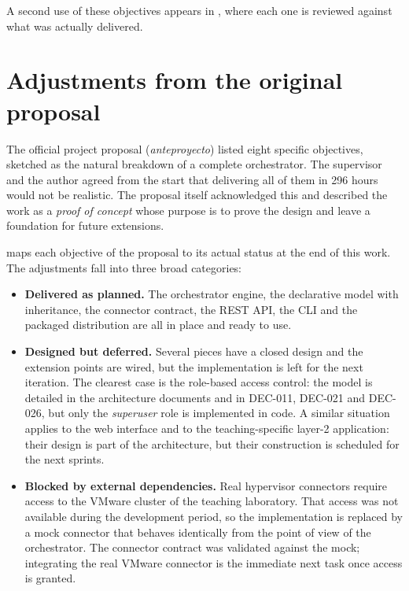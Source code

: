 A second use of these objectives appears in
, where each one is reviewed against what was
actually delivered.

\section{Adjustments from the original proposal}
\label{sec:ajustes}

The official project proposal (\emph{anteproyecto}) listed eight
specific objectives, sketched as the natural breakdown of a complete
orchestrator. The supervisor and the author agreed from the start
that delivering all of them in 296 hours would not be realistic. The
proposal itself acknowledged this and described the work as a
\emph{proof of concept} whose purpose is to prove the design and
leave a foundation for future extensions.

 maps each objective of the proposal to its
actual status at the end of this work. The adjustments fall into
three broad categories:

\begin{itemize}
  \item \textbf{Delivered as planned.} The orchestrator engine, the
        declarative model with inheritance, the connector contract,
        the REST API, the CLI and the packaged distribution are all
        in place and ready to use.
  \item \textbf{Designed but deferred.} Several pieces have a closed
        design and the extension points are wired, but the
        implementation is left for the next iteration. The clearest
        case is the role-based access control: the model is detailed
        in the architecture documents and in DEC-011, DEC-021 and
        DEC-026, but only the \emph{superuser} role is implemented in
        code. A similar situation applies to the web interface and
        to the teaching-specific layer-2 application: their design
        is part of the architecture, but their construction is
        scheduled for the next sprints.
  \item \textbf{Blocked by external dependencies.} Real hypervisor
        connectors require access to the VMware cluster of the
        teaching laboratory. That access was not available during the
        development period, so the implementation is replaced by a
        mock connector that behaves identically from the point of
        view of the orchestrator. The connector contract was
        validated against the mock; integrating the real VMware
        connector is the immediate next task once access is granted.
\end{itemize}

